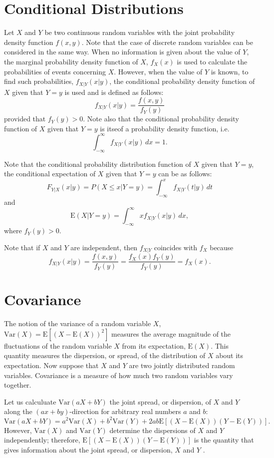 \documentclass[landscape, 20pt]{extreport}
\theoremstyle{definition}
\theoremstyle{definition}
\theoremstyle{definition}
\theoremstyle{definition}
\theoremstyle{remark}
\begin{document}
\hypertarget{conditional-distributions}{%
\section{Conditional Distributions}\label{conditional-distributions}}

Let \(X\) and \(Y\) be two continuous random variables with the joint
probability density function \(f (x, y)\). Note that the case of discrete
random variables can be considered in the same way. When no information
is given about the value of \(Y\), the marginal probability density
function of \(X\), \(f_X(x)\) is used to calculate the probabilities of
events concerning \(X\). However, when the value of \(Y\) is known, to find
such probabilities, \(f_{X|Y} (x|y)\), the conditional probability density
function of \(X\) given that \(Y = y\) is used and is defined as follows:
\[f_{X|Y} (x|y)  = \frac{f(x,y)}{f_Y(y)}\] provided that \(f_Y (y) > 0\).
Note also that the conditional probability density function of \(X\) given
that \(Y = y\) is itseof a probability density function, i.e.
\[\int_{-\infty}^\infty f_{X|Y}(x|y)\, dx  =  1.\]

Note that the conditional probability distribution function of \(X\) given
that \(Y = y\), the conditional expectation of \(X\) given that \(Y = y\) can
be as follows:
\[F_{Y|X}(x|y) = P(X \le x | Y = y) = \int_ {-\infty}^x f_{X|Y}(t|y) \, dt\]
and
\[\mathrm{E}(X|Y = y) =  \int_{-\infty}^{\infty} x  f_{X|Y}(x|y) \, dx,\]
where \(f_Y(y) > 0\).

Note that if \(X\) and \(Y\) are independent, then \(f_{X|Y}\) coincides with
\(f_X\) because
\[f_{X|Y}(x|y) = \frac{f(x,y)}{f_Y(y)} =\frac{f_X(x)f_Y(y)}{f_Y(y)} = f_X(x).\]

\hypertarget{covariance}{%
\section{Covariance}\label{covariance}}

The notion of the variance of a random variable \(X\),
\(\mathrm{Var}(X) = \mathrm{E}[ ( X - \mathrm{E}(X))^2]\) measures the
average magnitude of the fluctuations of the random variable \(X\) from
its expectation, \(\mathrm{E}(X)\). This quantity measures the dispersion,
or spread, of the distribution of \(X\) about its expectation. Now suppose
that \(X\) and \(Y\) are two jointly distributed random variables.
Covariance is a measure of how much two random variables vary together.

Let us calculuate \(\mathrm{Var}(aX + bY)\) the joint spread, or
dispersion, of \(X\) and \(Y\) along the \((ax + by)\)-direction for arbitrary
real numbers \(a\) and \(b\):
\[\mathrm{Var}(aX + bY) = a^2 \mathrm{Var}(X) + b^2 \mathrm{Var}(Y) + 2 a b \mathrm{E}[(X - \mathrm{E}(X))(Y - \mathrm{E}(Y))].\]
However, \(\mathrm{Var}(X)\) and \(\mathrm{Var}(Y )\) determine the
dispersions of \(X\) and \(Y\) independently; therefore,
\(\mathrm{E}[(X - \mathrm{E}(X))(Y - \mathrm{E}(Y))]\) is the quantity
that gives information about the joint spread, or dispersion, \(X\) and
\(Y\) .
\end{document}
